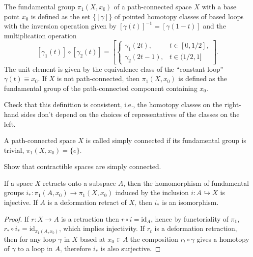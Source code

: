 \begin{defn}
    The fundamental group $\pi_1(X,x_0)$ of a path-connected space $X$ with a base point $x_0$ is defined as the set $\{ [\gamma]\}$ of pointed homotopy classes of based loops with the inversion operation given by $[\gamma(t)]^{-1}=[\gamma(1-t)]$ and the multiplication operation 
    \[
    [\gamma_1(t)]\circ [\gamma_2(t)]=\left[ \begin{cases} \gamma_1(2t), & t\in[0,1/2], \\ \gamma_2(2t-1), & t\in(1/2,1] \end{cases}\right].
    \]
    The unit element is given by the equivalence class of the ``constant loop'' $\gamma(t)\equiv x_0$. If $X$ is not path-connected, then $\pi_1(X,x_0)$ is defined as the fundamental group of the path-connected component containing $x_0$.
\end{defn}

\begin{xca}
    Check that this definition is consistent, i.e., the homotopy classes on the right-hand sides don't depend on the choices of representatives of the classes on the left.
\end{xca}
\begin{defn}
    A path-connected space $X$ is called simply connected if its fundamental group is trivial, $\pi_1(X,x_0)=\{e\}$.
\end{defn}

\begin{xca}
Show that contractible spaces are simply connected.
\end{xca}

\begin{thm}\label{thm retraction pi1}
    If a space $X$ retracts onto a subspace $A$, then the homomorphism of fundamental groups $i_\ast:\pi_1(A,x_0)\to \pi_1(X,x_0)$ induced by the inclusion $i: A\hookrightarrow X$ is injective. If $A$ is a deformation retract of $X$, then $i_\ast$ is an isomorphism.
\end{thm}
\begin{proof}
    If $r:X\to A$ is a retraction then $r\circ i=\mathrm{id}_A$, hence by functoriality of $\pi_1$, $r_\ast \circ i_\ast=\mathrm{id}_{\pi_1(A,x_0)}$, which implies injectivity. If $r_t$ is a deformation retraction, then for any loop $\gamma$ in $X$ based at $x_0\in A$ the composition $r_t\circ \gamma$ gives a homotopy of $\gamma$ to a loop in $A$, therefore $i_\ast$ is also surjective.
\end{proof}

